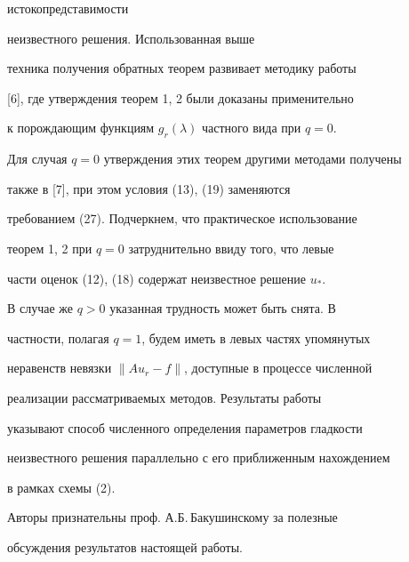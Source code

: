истокопредставимости 


неизвестного решения. Использованная выше 


техника получения обратных теорем развивает методику работы 


[6], где утверждения теорем 1, 2 были доказаны применительно 


к порождающим функциям $g_r(\lambda)$ частного вида при $q=0$. 


Для случая $q=0$ утверждения этих теорем другими методами получены 


также в [7], при этом условия (13), (19) заменяются 


требованием (27). Подчеркнем, что практическое использование 


теорем 1, 2 при $q=0$ затруднительно ввиду того, что левые 


части оценок (12), (18) содержат неизвестное решение $u_*$. 


В случае же $q>0$ указанная трудность может быть снята. В 


частности, полагая $q=1$, будем иметь в левых частях упомянутых 


неравенств невязки $\|Au_r-f\|$, доступные в процессе численной 


реализации рассматриваемых методов. Результаты работы 


указывают способ численного определения параметров гладкости 


неизвестного решения параллельно с его приближенным нахождением 


в рамках схемы (2). 


 


Авторы признательны проф. А.Б.\,Бакушинскому за полезные 


обсуждения результатов настоящей работы. 


 



